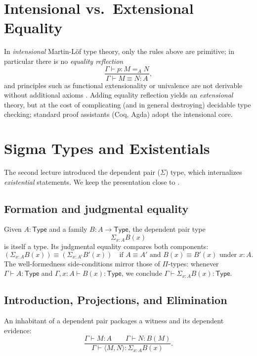 \documentclass[11pt]{article}
\newcommand{\Type}{\mathsf{Type}}
\newcommand{\Id}[3]{#1 =_{#2} #3}
\newcommand{\pair}[2]{\langle #1,#2\rangle}
\newcommand{\ctx}{\Gamma}
\theoremstyle{definition}
\theoremstyle{plain}
\theoremstyle{remark}
\begin{document}
\section{Intensional vs.\ Extensional Equality}
In \emph{intensional} Martin-L\"of type theory, only the rules above are primitive; in particular there is no \emph{equality reflection}
\begin{equation*}
\frac{\ctx \vdash p : \Id{M}{A}{N}}{\ctx \vdash M \equiv N : A},
\end{equation*}
and principles such as functional extensionality or univalence are not derivable without additional axioms \cite{harper2016pfpl,hottbook}. Adding equality reflection yields an \emph{extensional} theory, but at the cost of complicating (and in general destroying) decidable type checking; standard proof assistants (Coq, Agda) adopt the intensional core.

\section{Sigma Types and Existentials}
The second lecture introduced the dependent pair ($\Sigma$) type, which internalizes \emph{existential} statements. We keep the presentation close to \cite{harper2016pfpl}.

\subsection{Formation and judgmental equality}
Given $A : \Type$ and a family $B : A \to \Type$, the dependent pair type
\begin{equation*}
\Sigma_{x:A} B(x)
\end{equation*}
is itself a type. Its judgmental equality compares both components:
\begin{equation*}
(\Sigma_{x:A} B(x)) \equiv (\Sigma_{x:A'} B'(x)) \quad \text{if } A \equiv A' \text{ and } B(x) \equiv B'(x) \text{ under } x{:}A.
\end{equation*}
The well-formedness side-conditions mirror those of $\Pi$-types: whenever $\ctx \vdash A : \Type$ and $\ctx,x{:}A \vdash B(x) : \Type$, we conclude $\ctx \vdash \Sigma_{x:A} B(x) : \Type$.

\subsection{Introduction, Projections, and Elimination}

An inhabitant of a dependent pair packages a witness and its dependent evidence:
\begin{equation*}
\frac{\ctx \vdash M : A \qquad \ctx \vdash N : B(M)}
     {\ctx \vdash \pair{M}{N} : \Sigma_{x:A} B(x)}.
\end{equation*}
\end{document}
